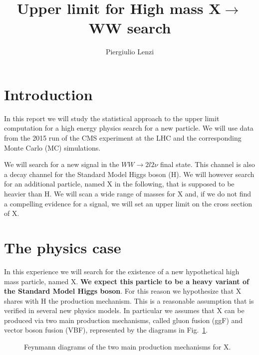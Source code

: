 \documentclass[a4paper,12pt]{article}
\title{Upper limit for High mass X$\rightarrow$WW search}
\author{Piergiulio Lenzi}
\begin{document}
\maketitle

\begin{abstract}
\end{abstract}

\section{Introduction}
In this report we will study the statistical approach to the upper limit
computation for a high energy physics search for a new particle.  We will use
data from the 2015 run of the CMS experiment at the LHC and the corresponding
Monte Carlo (MC) simulations.

We will search for a new signal in the $WW\rightarrow{}2l2\nu$ final state.
This channel is also a decay channel for the Standard Model Higgs boson (H).
We will however search for an additional particle, named X in the following,
that is supposed to be heavier than H. 
We will scan a wide range of masses for X and, if we do not find a compelling
evidence for a signal, we will set an upper limit on the  cross section of X.

\section{The physics case}
In this experience we will search for the existence of a new hypothetical high
mass particle, named X. {\bf We expect this particle to be a heavy variant of
the Standard Model Higgs boson}.  For this reason we hypothesize that X shares
with H the production mechanism. This is a reasonable assumption that is
verified in several new physics models.
In particular we assumes that X can be produced via two main production
mechanisms, called gluon fusion (ggF) and vector boson fusion (VBF),
represented by the diagrams in Fig.~\ref{fig:prod}.  \begin{figure}
 \centering
 \caption{Feynmann diagrams of the two main production mechanisms for X.\label{fig:prod}}
\end{figure}
\end{document}
